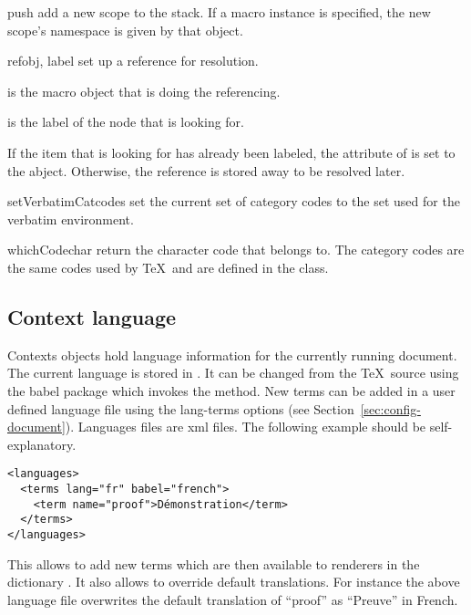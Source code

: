 \begin{methoddesc}[Context]{push}{}
add a new scope to the stack.  If a macro instance  is specified, 
the new scope's namespace is given by that object.
\end{methoddesc}

\begin{methoddesc}[Context]{ref}{obj, label}
set up a reference for resolution.  

 is the macro object that is doing the referencing.

 is the label of the node that  is looking for.

If the item that  is looking for has already been labeled, 
the  attribute of  is set to the abject.  
Otherwise, the reference is stored away to be resolved later. 
\end{methoddesc}

\begin{methoddesc}[Context]{setVerbatimCatcodes}{}
set the current set of category codes to the set used for the verbatim
environment.
\end{methoddesc}

\begin{methoddesc}[Context]{whichCode}{char}
return the character code that  belongs to.  The category
codes are the same codes used by \TeX\ and are defined in the 
 class.  
\end{methoddesc}

\subsection{Context language}\label{sec:context-language}

Contexts objects hold language information for the currently running
document. The current language is stored in
. It can be changed from the \TeX\ source
using the babel package which invokes the 
method. New terms can be added in a user defined language file using the
lang-terms options (see Section~\ref{sec:config-document}). Languages
files are xml files. The following example should be self-explanatory.

\begin{verbatim}
<languages>
  <terms lang="fr" babel="french">
    <term name="proof">Démonstration</term>
  </terms>
</languages>
\end{verbatim}

This allows to add new terms which are then available to renderers in
the dictionary . It also allows to override default
translations. For instance the above language file overwrites the
default translation of ``proof'' as ``Preuve'' in French.
